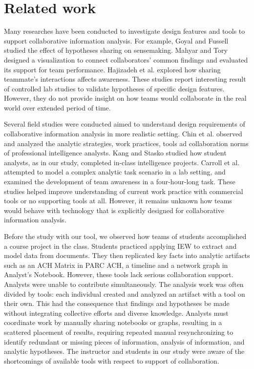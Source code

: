 \documentclass[]{article}
\date{}
\begin{document}
\section{Related work}\label{related-work}

Many researches have been conducted to investigate design features and
tools to support collaborative information analysis. For example, Goyal
and Fussell \autocite{Goyal2016} studied the effect of hypotheses
sharing on sensemaking. Mahyar and Tory \autocite{Mahyar2013} designed a
visualization to connect collaborators' common findings and evaluated
its support for team performance. Hajizadeh et al.
\autocite{Hajizadeh2013} explored how sharing teammate's interactions
affects awareness. These studies report interesting result of controlled
lab studies to validate hypotheses of specific design features. However,
they do not provide insight on how teams would collaborate in the real
world over extended period of time.

Several field studies were conducted aimed to understand design
requirements of collaborative information analysis in more realistic
setting. Chin et al. \autocite{Chin2009} observed and analyzed the
analytic strategies, work practices, tools ad collaboration norms of
professional intelligence analysts. Kang and Stasko \autocite{Kang2011}
studied how student analysts, as in our study, completed in-class
intelligence projects. Carroll et al. \autocite{Carroll2013} attempted
to model a complex analytic task scenario in a lab setting, and examined
the development of team awareness in a four-hour-long task. These
studies helped improve understanding of current work practice with
commercial tools or no supporting tools at all. However, it remains
unknown how teams would behave with technology that is explicitly
designed for collaborative information analysis.

Before the study with our tool, we observed how teams of students
accomplished a course project in the class. Students practiced applying
IEW to extract and model data from documents. They then replicated key
facts into analytic artifacts such as an ACH Matrix in PARC ACH, a
timeline and a network graph in Analyst's Notebook. However, these tools
lack serious collaboration support. Analysts were unable to contribute
simultaneously. The analysis work was often divided by tools: each
individual created and analyzed an artifact with a tool on their own.
This had the consequence that findings and hypotheses be made without
integrating collective efforts and diverse knowledge. Analysts must
coordinate work by manually sharing notebooks or graphs, resulting in a
scattered placement of results, requiring repeated manual
resynchronizing to identify redundant or missing pieces of information,
analysis of information, and analytic hypotheses. The instructor and
students in our study were aware of the shortcomings of available tools
with respect to support of collaboration.

\printbibliography
\end{document}
